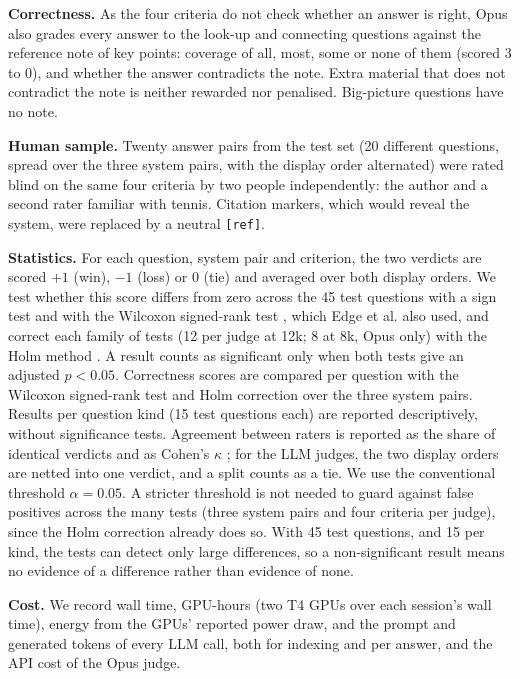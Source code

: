 \documentclass{article}
\begin{document}
\textbf{Correctness.} As the four criteria do not check whether an answer is right, Opus also
grades every answer to the look-up and connecting questions against the reference note of key points:
coverage of all, most, some or none of them (scored 3 to 0), and whether the answer contradicts the
note. Extra material that does not contradict the note is neither rewarded nor penalised. Big-picture
questions have no note.

\textbf{Human sample.} Twenty answer pairs from the test set (20 different questions, spread over the
three system pairs, with the display order alternated) were rated blind on the same four criteria by
two people independently: the author and a second rater familiar with tennis. Citation markers, which would reveal
the system, were replaced by a neutral \texttt{[ref]}.

\textbf{Statistics.} For each question, system pair and criterion, the two verdicts are scored $+1$
(win), $-1$ (loss) or $0$ (tie) and averaged over both display orders. We test whether this score
differs from zero across the 45 test questions with a sign test and with the Wilcoxon signed-rank test
\cite{wilcoxon1945}, which Edge et al. also used, and correct each family of tests (12 per judge at
12k; 8 at 8k, Opus only) with the Holm method \cite{holm1979simple}. A result counts as significant only when both
tests give an adjusted $p < 0.05$. Correctness scores are compared per question with the Wilcoxon
signed-rank test and Holm correction over the three system pairs. Results per question kind (15 test
questions each) are reported descriptively, without significance tests. Agreement between raters is reported
as the share of identical verdicts and as Cohen's $\kappa$ \cite{cohen1960kappa}; for the LLM judges,
the two display orders are netted into one verdict, and a split counts as a tie.
We use the conventional threshold $\alpha = 0.05$. A stricter threshold is not needed to guard
against false positives across the many tests (three system pairs and four criteria per judge),
since the Holm correction already does so.
With 45 test questions, and 15 per kind, the tests can detect only large differences, so a
non-significant result means no evidence of a difference rather than evidence of none.

\textbf{Cost.} We record wall time, GPU-hours (two T4 GPUs over each session's wall time), energy from
the GPUs' reported power draw, and the prompt and generated tokens of every LLM call, both for
indexing and per answer, and the API cost of the Opus judge.
\end{document}
